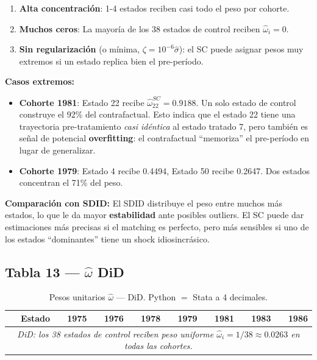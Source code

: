 \documentclass[11pt, a4paper]{article}
\begin{document}
\begin{enumerate}
  \item \textbf{Alta concentración}: 1-4 estados reciben casi todo el peso por cohorte.
  \item \textbf{Muchos ceros}: La mayoría de los 38 estados de control reciben $\hat{\omega}_i=0$.
  \item \textbf{Sin regularización} (o mínima, $\zeta=10^{-6}\hat{\sigma}$): el SC
    puede asignar pesos muy extremos si un estado replica bien el pre-período.
\end{enumerate}

\begin{interpretacion}
\textbf{Casos extremos:}

\begin{itemize}
  \item \textbf{Cohorte 1981}: Estado 22 recibe $\hat{\omega}_{22}^{SC}=0.9188$.
    Un solo estado de control construye el 92\% del contrafactual. Esto indica que
    el estado 22 tiene una trayectoria pre-tratamiento \textit{casi idéntica}
    al estado tratado 7, pero también es señal de potencial \textbf{overfitting}:
    el contrafactual ``memoriza'' el pre-período en lugar de generalizar.
  \item \textbf{Cohorte 1979}: Estado 4 recibe 0.4494, Estado 50 recibe 0.2647.
    Dos estados concentran el 71\% del peso.
\end{itemize}

\medskip
\textbf{Comparación con SDID:} El SDID distribuye el peso entre muchos más estados,
lo que le da mayor \textbf{estabilidad} ante posibles outliers. El SC puede dar
estimaciones más precisas si el matching es perfecto, pero más sensibles si uno
de los estados ``dominantes'' tiene un shock idiosincrásico.
\end{interpretacion}

\subsection{Tabla 13 — $\hat{\omega}$ DiD}

\begin{table}[H]
\centering
\caption{Pesos unitarios $\hat{\omega}$ --- DiD. Python $=$ Stata a 4 decimales.}
\small
\begin{tabular}{rrrrrrrr}
\toprule
Estado & 1975 & 1976 & 1978 & 1979 & 1981 & 1983 & 1986 \\
\midrule
\multicolumn{8}{c}{\textit{DiD: los 38 estados de control reciben peso uniforme
$\hat{\omega}_i = 1/38 \approx 0.0263$ en todas las cohortes.}} \\
\bottomrule
\end{tabular}
\end{table}
\end{document}
